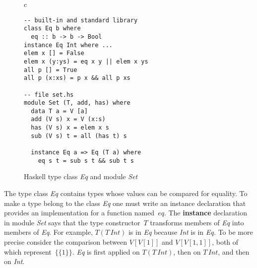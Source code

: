 \documentclass[conference,compsoc]{IEEEtran} %
\begin{document}
\begin{figure}\footnotesize %
\begin{center}
\begin{tabular}{c}
\begin{lstlisting}[style=hs]
-- built-in and standard library
class Eq b where
  eq :: b -> b -> Bool
instance Eq Int where ...
elem x [] = False
elem x (y:ys) = eq x y || elem x ys
all p [] = True
all p (x:xs) = p x && all p xs

-- file set.hs
module Set (T, add, has) where
  data T a = V [a]
  add (V s) x = V (x:s)
  has (V s) x = elem x s
  sub (V s) t = all (has t) s

  instance Eq a => Eq (T a) where
    eq s t = sub s t && sub t s
\end{lstlisting}
\end{tabular}
\end{center}
\caption{Haskell type class \textit{Eq} and module \textit{Set}}
\label{fig:haskell}
\end{figure} %


The type class \textit{Eq} contains types whose values can be compared for
equality. To make a type belong to the class \textit{Eq} one must write an
instance declaration that provides an implementation for a function
named~$eq$. The \textbf{instance} declaration in module \textit{Set} says
that the type constructor~$T$ transforms members of \textit{Eq} into
members of \textit{Eq}. For example, $T(T\,\mathit{Int})$ is in \textit{Eq}
because \textit{Int} is in \textit{Eq.} To be more precise consider the
comparison between  $V[V[1]]$ and $V[V[1,1]]$, both of which
represent~$\{\{1\}\}$. \textit{Eq} is first applied on
$T(T\,\mathit{Int})$, then on $T\,\mathit{Int}$, and then on \textit{Int}.



\end{document}
